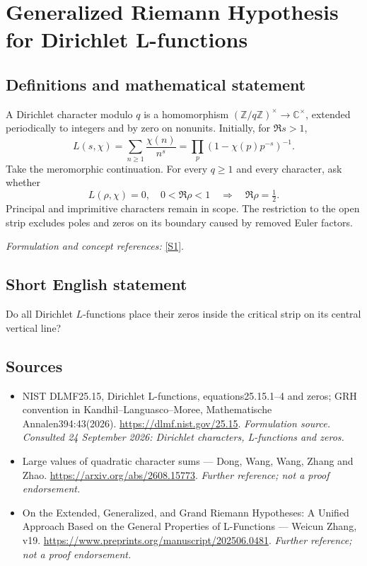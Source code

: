 \documentclass[11pt]{article}
\begin{document}
\section*{\texorpdfstring{Generalized Riemann Hypothesis for Dirichlet L-functions}{Generalized Riemann Hypothesis for Dirichlet L-functions}}\label{9}
\subsection{Definitions and mathematical statement}
A Dirichlet character modulo $q$ is a homomorphism $({\mathbb{Z}}/q{\mathbb{Z}})^\times\to{\mathbb{C}}^\times$, extended periodically to integers and by zero on nonunits. Initially, for $\Re s>1$,
\[
 L(s,\chi)=\sum_{n\ge1}\frac{\chi(n)}{n^s}=\prod_p(1-\chi(p)p^{-s})^{-1}.
\]
Take the meromorphic continuation. For every $q\ge1$ and every character, ask whether
\[
 L(\rho,\chi)=0,\quad0<\Re\rho<1\quad\Longrightarrow\quad\Re\rho=\tfrac12.
\]
Principal and imprimitive characters remain in scope. The restriction to the open strip excludes poles and zeros on its boundary caused by removed Euler factors.
\par\smallskip\textit{Formulation and concept references:} \href{https://dlmf.nist.gov/25.15}{[S1]}.

\subsection{Short English statement}
Do all Dirichlet $L$-functions place their zeros inside the critical strip on its central vertical line?
\subsection{Sources}
\begin{itemize}
\item[S1]NIST DLMF25.15, Dirichlet L-functions, equations25.15.1–4 and zeros; GRH convention in Kandhil–Languasco–Moree, Mathematische Annalen394:43(2026).
\url{https://dlmf.nist.gov/25.15}.
\textit{Formulation source. Consulted 24 September 2026: Dirichlet characters, L-functions and zeros.}
\item[S2]Large values of quadratic character sums — Dong, Wang, Wang, Zhang and Zhao.
\url{https://arxiv.org/abs/2608.15773}.
\textit{Further reference; not a proof endorsement.}
\item[S3]On the Extended, Generalized, and Grand Riemann Hypotheses: A Unified Approach Based on the General Properties of L-Functions — Weicun Zhang, v19.
\url{https://www.preprints.org/manuscript/202506.0481}.
\textit{Further reference; not a proof endorsement.}
\end{itemize}
\end{document}

